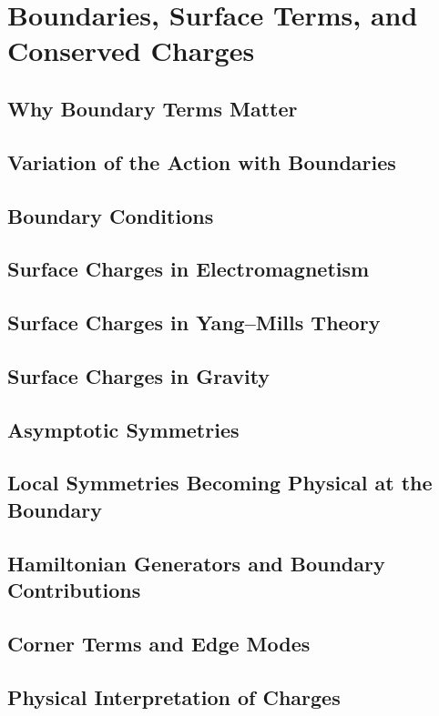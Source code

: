 \chapter{Boundaries, Surface Terms, and Conserved Charges}

\section{Why Boundary Terms Matter}
\section{Variation of the Action with Boundaries}
\section{Boundary Conditions}
\section{Surface Charges in Electromagnetism}
\section{Surface Charges in Yang--Mills Theory}
\section{Surface Charges in Gravity}
\section{Asymptotic Symmetries}
\section{Local Symmetries Becoming Physical at the Boundary}
\section{Hamiltonian Generators and Boundary Contributions}
\section{Corner Terms and Edge Modes}
\section{Physical Interpretation of Charges}
